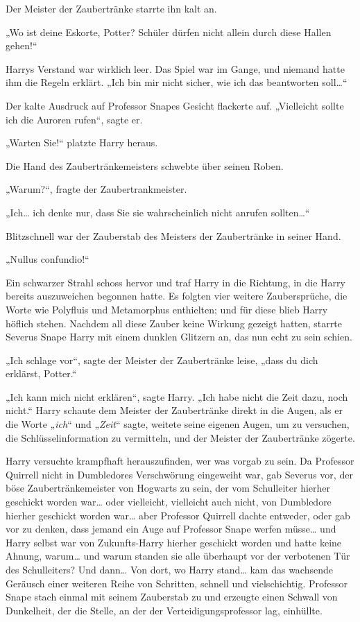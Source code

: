 {Der Meister der Zaubertränke starrte ihn kalt an.

„Wo ist deine Eskorte, Potter? Schüler dürfen nicht allein durch diese Hallen gehen!“

Harrys Verstand war wirklich leer. Das Spiel war im Gange, und niemand hatte ihm die Regeln erklärt. „Ich bin mir nicht sicher, wie ich das beantworten soll…“

Der kalte Ausdruck auf Professor Snapes Gesicht flackerte auf. „Vielleicht sollte ich die Auroren rufen“, sagte er.

„Warten Sie!“ platzte Harry heraus.

Die Hand des Zaubertränkemeisters schwebte über seinen Roben.

„Warum?“, fragte der Zaubertrankmeister.

„Ich… ich denke nur, dass Sie sie wahrscheinlich nicht anrufen sollten…“

Blitzschnell war der Zauberstab des Meisters der Zaubertränke in seiner Hand.

„Nullus confundio!“

Ein schwarzer Strahl schoss hervor und traf Harry in die Richtung, in die Harry bereits auszuweichen begonnen hatte. Es folgten vier weitere Zaubersprüche, die Worte wie Polyfluis und Metamorphus enthielten; und für diese blieb Harry höflich stehen. Nachdem all diese Zauber keine Wirkung gezeigt hatten, starrte Severus Snape Harry mit einem dunklen Glitzern an, das nun echt zu sein schien.

„Ich schlage vor“, sagte der Meister der Zaubertränke leise, „dass du dich erklärst, Potter.“

„Ich kann mich nicht erklären“, sagte Harry. „Ich habe nicht die Zeit dazu, noch nicht.“ Harry schaute dem Meister der Zaubertränke direkt in die Augen, als er die Worte „\emph{ich}“ und „\emph{Zeit}“ sagte, weitete seine eigenen Augen, um zu versuchen, die Schlüsselinformation zu vermitteln, und der Meister der Zaubertränke zögerte.

Harry versuchte krampfhaft herauszufinden, wer was vorgab zu sein. Da Professor Quirrell nicht in Dumbledores Verschwörung eingeweiht war, gab Severus vor, der böse Zaubertränkemeister von Hogwarts zu sein, der vom Schulleiter hierher geschickt worden war… oder vielleicht, vielleicht auch nicht, von Dumbledore hierher geschickt worden war… aber Professor Quirrell dachte entweder, oder gab vor zu denken, dass jemand ein Auge auf Professor Snape werfen müsse… und Harry selbst war von Zukunfts-Harry hierher geschickt worden und hatte keine Ahnung, warum… und warum standen sie alle überhaupt vor der verbotenen Tür des Schulleiters? Und dann… Von dort, wo Harry stand… kam das wachsende Geräusch einer weiteren Reihe von Schritten, schnell und vielschichtig. Professor Snape stach einmal mit seinem Zauberstab zu und erzeugte einen Schwall von Dunkelheit, der die Stelle, an der der Verteidigungsprofessor lag, einhüllte.

}
